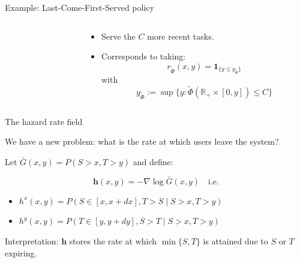 \documentclass[aspectratio=169]{beamer}
\newcommand{\R}{\mathbb{R}}
\begin{document}
\begin{frame}{Example: Last-Come-First-Served policy}
\begin{columns}
\begin{column}{0.45\textwidth}
		\end{column}
	\begin{column}{0.55\textwidth}
		\begin{itemize}
			\item Serve the $C$ more recent tasks.
			\item Corresponds to taking:
				\begin{equation*}
					r_{\tilde\Phi}(x,y) = \mathbf{1}_{\{y\leqslant y_{\tilde\Phi}\}} 
				\end{equation*}
				with
				\begin{equation*} 
					y_{\tilde\Phi} := \sup\{y: \tilde\Phi(\R_+\times [0, y]) \leqslant C\}
				\end{equation*} 
		\end{itemize}
	\end{column}
\end{columns}

\end{frame}

\begin{frame}{The hazard rate field}

	We have a new problem: what is the rate at which users \alert{leave} the system?

	\pause

	\vfill

	Let $\bar{G}(x,y) = P(S>x,T>y)$ and define:

	\begin{definition}
		\begin{equation*}
			\mathbf{h}(x,y) = -\nabla \log \bar{G}(x,y)	\quad \text{i.e.}
		\end{equation*}
		\begin{itemize}
			\item $h^x (x,y) = P(S\in[x,x+dx],T>S \mid S>x,T>y)$
			\item $h^y (x,y) = P(T\in[y,y+dy],S>T \mid S>x,T>y)$
		\end{itemize}
	\end{definition}

	\vfill

	Interpretation: $\mathbf{h}$ stores the rate at which $\min\{S,T\}$ is attained due to $S$ or $T$ expiring.
\end{frame}
\end{document}
